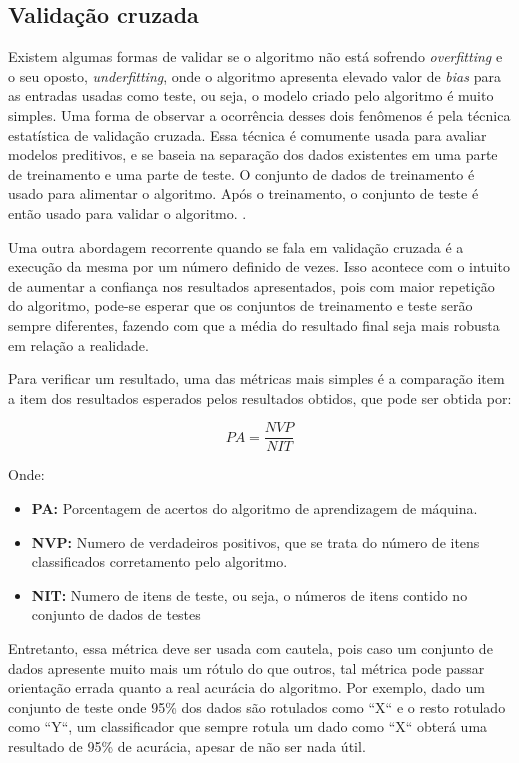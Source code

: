 \subsection{Validação cruzada}\label{subsec:validacao_cruzada}

Existem algumas formas de validar se o algoritmo não está sofrendo \textit{overfitting}
e o seu oposto, \textit{underfitting}, onde o algoritmo apresenta elevado valor
de \textit{bias} para as entradas usadas como teste, ou seja, o modelo criado
pelo algoritmo é muito simples. Uma forma de observar a ocorrência desses dois
fenômenos é pela técnica estatística de validação cruzada. Essa técnica é
comumente usada para avaliar modelos preditivos, e se baseia na separação dos
dados existentes em uma parte de treinamento e uma parte de teste. O conjunto de
dados de treinamento é usado para alimentar o algoritmo. Após o treinamento,
o conjunto de teste é então usado para validar o algoritmo. \cite{araujo2011apprecommender}.

Uma outra abordagem recorrente quando se fala em validação cruzada é a execução
da mesma por um número definido de vezes. Isso acontece com o intuito de
aumentar a confiança nos resultados apresentados, pois com maior repetição do
algoritmo, pode-se esperar que os conjuntos de treinamento e teste serão sempre
diferentes, fazendo com que a média do resultado final seja mais robusta em
relação a realidade.

Para verificar um resultado, uma das métricas mais simples é a comparação item a
item dos resultados esperados pelos resultados obtidos, que pode ser obtida por:

\begin{equation} \label{eq:porcentagem_acertos}
PA = \frac{NVP}{NIT}
\end{equation}

Onde:

\begin{itemize}
    \item \textbf{PA:} Porcentagem de acertos do algoritmo de aprendizagem
    de máquina.
    \item \textbf{NVP:} Numero de verdadeiros positivos, que se trata do
    número de itens classificados corretamento pelo algoritmo.
    \item \textbf{NIT:} Numero de itens de teste, ou seja, o números de itens contido no conjunto de dados de testes
\end{itemize}

Entretanto, essa métrica deve ser usada com cautela, pois caso um conjunto de
dados apresente muito mais um rótulo do que outros, tal métrica pode passar
orientação errada quanto a real acurácia do algoritmo. Por exemplo, dado um
conjunto de teste onde 95\% dos dados são rotulados como ``X`` e o resto rotulado
como ``Y``, um classificador que sempre rotula um dado como ``X`` obterá uma
resultado de 95\% de acurácia, apesar de não ser nada útil.
